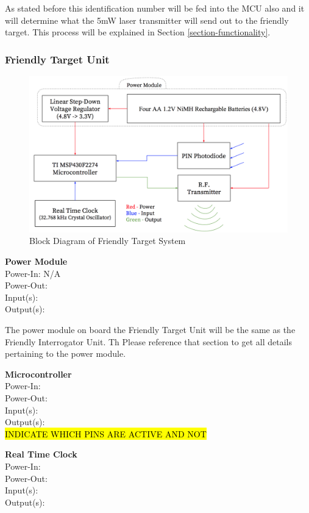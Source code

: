 \documentclass[letterpaper,10pt]{article}
\begin{document}
\begin{spacing}{1.15}
As stated before this identification number will be fed into the MCU also and it will determine what the 5mW laser transmitter will send out to the friendly target. This process will be explained in Section \ref{section-functionality}.

\subsubsection{Friendly Target Unit}

\begin{figure} [H]
	\centering
	\includegraphics[scale=0.50]{Friendly_Target_Block_Diagram.png}
	\caption{Block Diagram of Friendly Target System\label{fig:friendly-target-block}}
\end{figure}

\normalsize\textbf{Power Module} \\
Power-In: N/A\\
Power-Out: \\
Input(s): \\
Output(s):

The power module on board the Friendly Target Unit will be the same as the Friendly Interrogator Unit. Th Please reference that section to get all details pertaining to the power module.


\normalsize\textbf{Microcontroller} \\
Power-In: \\
Power-Out:\\
Input(s):\\
Output(s):\\
\hl{INDICATE WHICH PINS ARE ACTIVE AND NOT}

\normalsize\textbf{Real Time Clock} \\
Power-In: \\
Power-Out: \\
Input(s): \\
Output(s):


\end{spacing}
\end{document}
